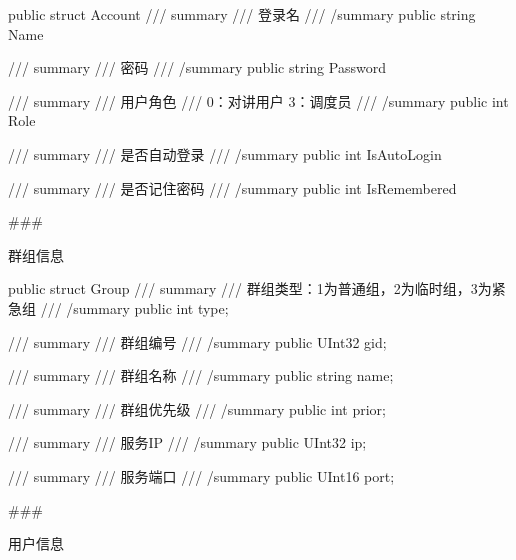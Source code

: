 \documentclass[letterpaper,10pt,english]{sphinxmanual}
\begin{document}
%
\begin{sphinxVerbatim}[commandchars=\\\{\}]
public struct Account
\PYGZob{}
       /// \PYGZlt{}summary\PYGZgt{}
       /// 登录名
       /// \PYGZlt{}/summary\PYGZgt{}
       public string Name

       /// \PYGZlt{}summary\PYGZgt{}
       /// 密码
       /// \PYGZlt{}/summary\PYGZgt{}
       public string Password

       /// \PYGZlt{}summary\PYGZgt{}
       /// 用户角色
       /// 0：对讲用户 3：调度员
       /// \PYGZlt{}/summary\PYGZgt{}
       public int Role

       /// \PYGZlt{}summary\PYGZgt{}
       /// 是否自动登录
       /// \PYGZlt{}/summary\PYGZgt{}
       public int IsAutoLogin

       /// \PYGZlt{}summary\PYGZgt{}
       /// 是否记住密码
       /// \PYGZlt{}/summary\PYGZgt{}
       public int IsRemembered
\PYGZcb{}
\end{sphinxVerbatim}

\#\#\#



群组信息



%
\begin{sphinxVerbatim}[commandchars=\\\{\}]
 public struct Group
   \PYGZob{}
    /// \PYGZlt{}summary\PYGZgt{}
    /// 群组类型：1为普通组，2为临时组，3为紧急组
    /// \PYGZlt{}/summary\PYGZgt{}
    public int type;

    /// \PYGZlt{}summary\PYGZgt{}
    /// 群组编号
    /// \PYGZlt{}/summary\PYGZgt{}
    public UInt32 gid;

    /// \PYGZlt{}summary\PYGZgt{}
    /// 群组名称
    /// \PYGZlt{}/summary\PYGZgt{}
    public string name;

    /// \PYGZlt{}summary\PYGZgt{}
    /// 群组优先级
    /// \PYGZlt{}/summary\PYGZgt{}
    public int prior;

    /// \PYGZlt{}summary\PYGZgt{}
    /// 服务IP
    /// \PYGZlt{}/summary\PYGZgt{}
    public UInt32 ip;

    /// \PYGZlt{}summary\PYGZgt{}
    /// 服务端口
    /// \PYGZlt{}/summary\PYGZgt{}
    public UInt16 port;
\PYGZcb{}
\end{sphinxVerbatim}

\#\#\#



用户信息
\end{document}
